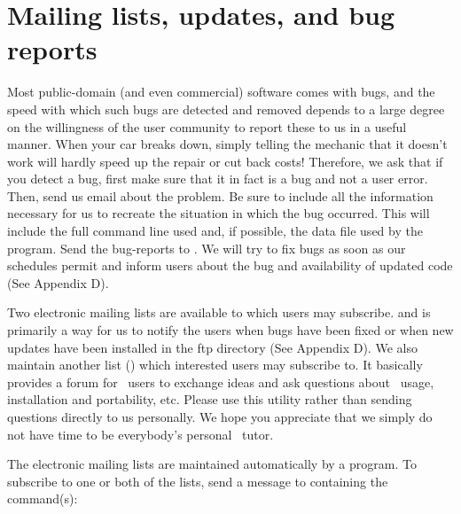%
%
\chapter{Mailing lists, updates, and bug reports}
\thispagestyle{headings}

Most public-domain (and even commercial) software comes
with bugs, and the speed with which such bugs are detected
and removed depends to a large degree on the willingness
of the user community to report these to us in a useful
manner.  When your car breaks down, simply telling the
mechanic that it doesn't work will hardly speed up the
repair or cut back costs!  Therefore, we ask that if
you detect a bug, first make sure that it in fact is a
bug and not a user error.  Then, send us email about the
problem.  Be sure to include all the information necessary
for us to recreate the situation in which the bug occurred.
This will include the full command line used and, if
possible, the data file used by the program.  Send the
bug-reports to
.
We will try to fix bugs as soon as our schedules permit and
inform users about the bug and availability of updated code
(See Appendix D).

Two electronic mailing lists are available to which
users may subscribe. 
and is primarily a way for us to notify the users when bugs
have been fixed or when new updates have been installed in
the ftp directory (See Appendix D).  We also maintain another list
() which interested users may
subscribe to.  It basically provides a forum for \GMT\ users
to exchange ideas and ask questions about \GMT\ usage,
installation and portability, etc. Please use this utility
rather than sending questions directly to us personally.
We hope you appreciate that we simply do not have time to be
everybody's personal \GMT\ tutor.

The electronic mailing lists are maintained automatically
by a program.  To subscribe to one or both of the lists,
send a message to
containing the command(s):


